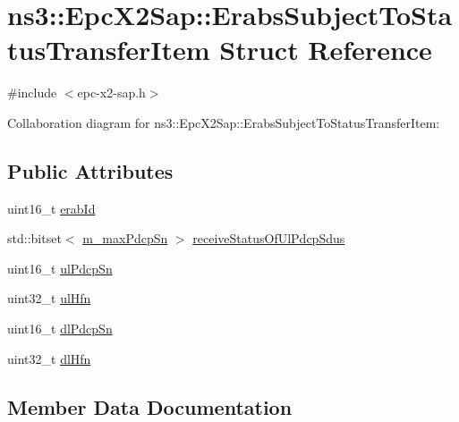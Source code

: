 \hypertarget{structns3_1_1EpcX2Sap_1_1ErabsSubjectToStatusTransferItem}{}\section{ns3\+:\+:Epc\+X2\+Sap\+:\+:Erabs\+Subject\+To\+Status\+Transfer\+Item Struct Reference}
\label{structns3_1_1EpcX2Sap_1_1ErabsSubjectToStatusTransferItem}


{\ttfamily \#include $<$epc-\/x2-\/sap.\+h$>$}



Collaboration diagram for ns3\+:\+:Epc\+X2\+Sap\+:\+:Erabs\+Subject\+To\+Status\+Transfer\+Item\+:
\subsection*{Public Attributes}
\begin{DoxyCompactItemize}
\item 
uint16\+\_\+t \hyperlink{structns3_1_1EpcX2Sap_1_1ErabsSubjectToStatusTransferItem_a495bc5105b0e5568de94b49a0a658aeb}{erab\+Id}
\item 
std\+::bitset$<$ \hyperlink{classns3_1_1EpcX2Sap_a41ff74ac24a6c9005d586f75cf366f95}{m\+\_\+max\+Pdcp\+Sn} $>$ \hyperlink{structns3_1_1EpcX2Sap_1_1ErabsSubjectToStatusTransferItem_a32bf29a8c3d8aa391bcebac2c813afa2}{receive\+Status\+Of\+Ul\+Pdcp\+Sdus}
\item 
uint16\+\_\+t \hyperlink{structns3_1_1EpcX2Sap_1_1ErabsSubjectToStatusTransferItem_aef54221f1ca1176b0fc4404a87ed36dc}{ul\+Pdcp\+Sn}
\item 
uint32\+\_\+t \hyperlink{structns3_1_1EpcX2Sap_1_1ErabsSubjectToStatusTransferItem_a1481c57b5951d1d2f93fd7a35d38d5cf}{ul\+Hfn}
\item 
uint16\+\_\+t \hyperlink{structns3_1_1EpcX2Sap_1_1ErabsSubjectToStatusTransferItem_afe91f46df5688c87f45bfa90ca615290}{dl\+Pdcp\+Sn}
\item 
uint32\+\_\+t \hyperlink{structns3_1_1EpcX2Sap_1_1ErabsSubjectToStatusTransferItem_a290503c5290aab1637782ef3a8c20929}{dl\+Hfn}
\end{DoxyCompactItemize}


\subsection{Member Data Documentation}
